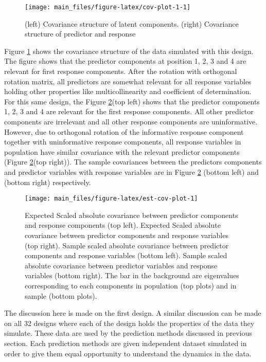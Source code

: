 \documentclass[12pt,3p,authoryear]{elsarticle}
\theoremstyle{definition}
\theoremstyle{definition}
\theoremstyle{definition}
\theoremstyle{remark}
\begin{document}
\begin{figure}
\texttt{[image: main\_files/figure-latex/cov-plot-1-1]} \caption{(left) Covariance structure of latent components. (right) Covariance structure of predictor and response}\label{fig:cov-plot-1}
\end{figure}

Figure \ref{fig:cov-plot-1} shows the covariance structure of the data
simulated with this design. The figure shows that the predictor
components at position 1, 2, 3 and 4 are relevant for first response
components. After the rotation with orthogonal rotation matrix, all
predictors are somewhat relevant for all response variables holding
other properties like multicollinearity and coefficient of
determination. For this same design, the Figure
\ref{fig:est-cov-plot}(top left) shows that the predictor components 1,
2, 3 and 4 are relevant for the first response components. All other
predictor components are irrelevant and all other response components
are uninformative. However, due to orthogonal rotation of the
informative response component together with uninformative response
components, all response variables in population have similar covariance
with the relevant predictor components (Figure
\ref{fig:est-cov-plot}(top right)). The sample covariances between the
predictors components and predictor variables with response variables
are in Figure \ref{fig:est-cov-plot} (bottom left) and (bottom right)
respectively.

\begin{figure}
\texttt{[image: main\_files/figure-latex/est-cov-plot-1]} \caption{Expected Scaled absolute covariance between predictor components and response components (top left). Expected Scaled absolute covariance between predictor components and response variables (top right). Sample scaled absolute covariance between predictor components and response variables (bottom left). Sample scaled absolute covariance between predictor variables and response variables (bottom right). The bar in the background are eigenvalues corresponding to each components in population (top plots) and in sample (bottom plots).}\label{fig:est-cov-plot}
\end{figure}

The discussion here is made on the first design. A similar discussion
can be made on all 32 designs where each of the design holds the
properties of the data they simulate. These data are used by the
prediction methods discussed in previous section. Each prediction
methods are given independent dataset simulated in order to give them
equal opportunity to understand the dynamics in the data.
\end{document}
